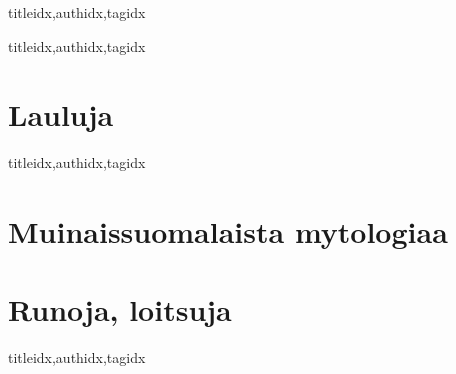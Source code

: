 \documentclass[twoside,10pt]{book}
\renewcommand{\lyricfont}{\sffamily\large} %
\begin{document}
  \clearpage\scleardpage
    \begin{songs}{titleidx,authidx,tagidx}
      \setcounter{songnum}{400}
      
    \end{songs}

  \clearpage\scleardpage
    \begin{songs}{titleidx,authidx,tagidx}
      \setcounter{songnum}{700}
      
    \end{songs} 
    
  \clearpage\scleardpage
    \begin{otherlanguage}{finnish} %
      \section{Lauluja}
        \begin{songs}{titleidx,authidx,tagidx}
          \setcounter{songnum}{800}
          
          
        \end{songs}
      \clearpage\scleardpage
      \section{Muinaissuomalaista mytologiaa}
        
      \clearpage\scleardpage
      \section{Runoja, loitsuja}
        \begin{songs}{titleidx,authidx,tagidx}
          \setcounter{songnum}{900}
          \chordsoff %
          \renewcommand{\lyricfont}{\sffamily\small} %
          
          \renewcommand{\lyricfont}{\sffamily\large} %
          \chordson
        \end{songs}
    \end{otherlanguage}
\end{document}
